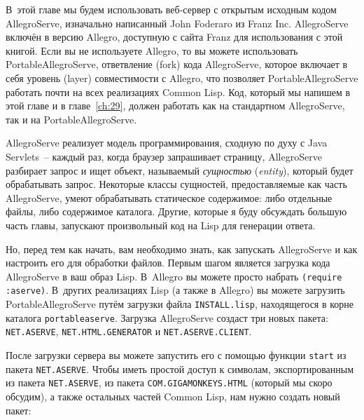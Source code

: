 В~этой главе мы будем использовать веб-сервер с открытым исходным кодом AllegroServe,
изначально написанный John Foderaro из Franz Inc. AllegroServe включён в версию Allegro,
доступную с сайта Franz для использования с этой книгой. Если вы не используете Allegro,
то вы можете использовать PortableAllegroServe, ответвление (fork) кода AllegroServe,
которое включает в себя уровень (layer) совместимости с Allegro, что позволяет
PortableAllegroServe работать почти на всех реализациях Common Lisp. Код, который мы
напишем в этой главе и в главе~\ref{ch:29}, должен работать как на стандартном
AllegroServe, так и на PortableAllegroServe.

AllegroServe реализует модель программирования, сходную по духу с Java Servlets~-- каждый
раз, когда браузер запрашивает страницу, AllegroServe разбирает запрос и ищет объект,
называемый \textit{сущностью} (\textit{entity}), который будет обрабатывать
запрос. Некоторые классы сущностей, предоставляемые как часть AllegroServe, умеют
обрабатывать статическое содержимое: либо отдельные файлы, либо содержимое
каталога. Другие, которые я буду обсуждать большую часть главы, запускают произвольный код
на Lisp для генерации ответа.

Но, перед тем как начать, вам необходимо знать, как запускать AllegroServe и как настроить
его для обработки файлов. Первым шагом является загрузка кода AllegroServe в ваш образ
Lisp. В~Allegro вы можете просто набрать \lstinline{(require :aserve)}. В~других реа\-ли\-за\-циях
Lisp (а также в Allegro) вы можете загрузить PortableAllegroServe путём загрузки файла
\lstinline{INSTALL.lisp}, находящегося в корне каталога \lstinline{portableaserve}. Загрузка
AllegroServe создаст три новых пакета: \lstinline{NET.ASERVE}, \lstinline{NET.HTML.GENERATOR} и
\lstinline{NET.ASERVE.CLIENT}.

После загрузки сервера вы можете запустить его с помощью функции \lstinline{start} из пакета
\lstinline{NET.ASERVE}. Чтобы иметь простой доступ к символам, экспортированным из пакета
\lstinline{NET.ASERVE}, из пакета \lstinline{COM.GIGAMONKEYS.HTML} (который мы скоро обсудим), а
также остальных частей Common Lisp, нам нужно создать новый пакет:


